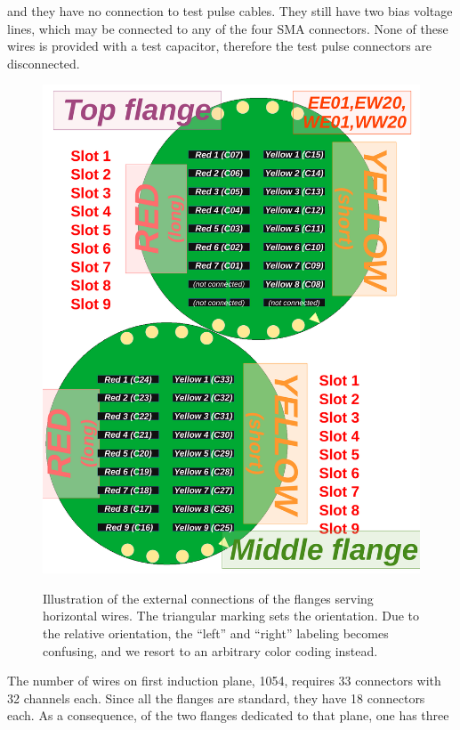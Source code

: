 and they have no connection to test pulse cables.
They still have two bias voltage lines, which may be connected to any of the
four SMA connectors. None of these wires is provided with a test capacitor,
therefore the test pulse connectors are disconnected.
\begin{figure}
  {
    \centering
    \includegraphics[width=\textwidth]{fig/CornerFlanges}
    \\
  }
  \caption{\label{fig:HorizontalWireChimney}
    Illustration of the external connections of the flanges serving horizontal
    wires.
    The triangular marking sets the orientation.
    Due to the relative orientation, the ``left'' and ``right'' labeling becomes
    confusing, and we resort to an arbitrary color coding instead.
  }
\end{figure}
The number of wires on first induction plane, 1054, requires 33 connectors with
32 channels each.
Since all the flanges are standard, they have 18 connectors each.
As a consequence, of the two flanges dedicated to that plane, one has three
